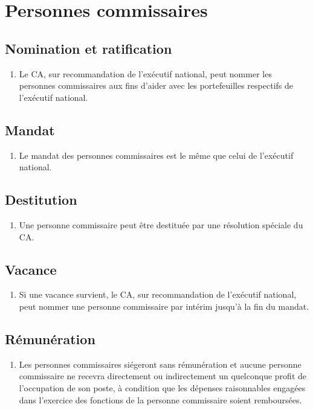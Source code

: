 \section{Personnes commissaires}
\label{personnes-commissaires}

\subsection{Nomination et ratification}
\label{personnes-commissaires-nomination-et-ratification}

\begin{enumerate}
 \item Le CA, sur recommandation de l'exécutif national, peut nommer les personnes commissaires aux fins d'aider avec les portefeuilles respectifs de l'exécutif national.
\end{enumerate}

\subsection{Mandat}
\label{personnes-commissaires-mandat}

\begin{enumerate}
 \item Le mandat des personnes commissaires est le même que celui de l’exécutif national.
\end{enumerate}

\subsection{Destitution}
\label{personnes-commissaires-destitution}

\begin{enumerate}
 \item Une personne commissaire peut être destituée par une résolution spéciale du CA.
\end{enumerate}

\subsection{Vacance}
\label{personnes-commissaires-vacance}

\begin{enumerate}
 \item Si une vacance survient, le CA, sur recommandation de l'exécutif national, peut nommer une personne commissaire par intérim jusqu'à la fin du mandat.
\end{enumerate}

\subsection{Rémunération}
\label{personnes-commissaires-remuneration}

\begin{enumerate}
 \item Les personnes commissaires siégeront sans rémunération et aucune personne commissaire ne recevra directement ou indirectement un quelconque profit de l'occupation de son poste, à condition que les dépenses raisonnables engagées dans l'exercice des fonctions de la personne commissaire soient remboursées.
\end{enumerate}
